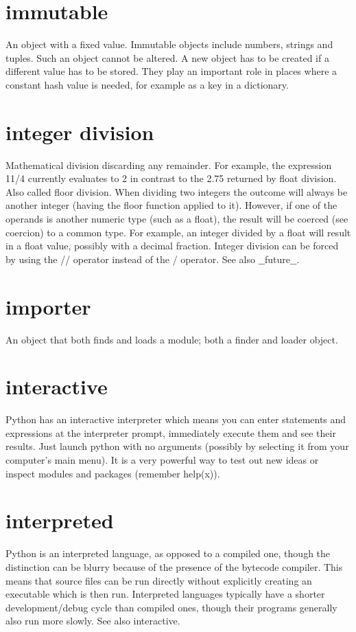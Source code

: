 \documentclass[12pt,a4paper,final,twoside,onecolumn,titlepage]{book}
\begin{document}
\section{immutable}
An object with a fixed value. Immutable objects include numbers, strings and tuples. Such an object cannot be altered. A new object has to be created if a different value has to be stored. They play an important role in places where a constant hash value is needed, for example as a key in a dictionary.

\section{integer division}
Mathematical division discarding any remainder. For example, the expression 11/4 currently evaluates to 2 in contrast to the 2.75 returned by float division. Also called floor division. When dividing two integers the outcome will always be another integer (having the floor function applied to it). However, if one of the operands is another numeric type (such as a float), the result will be coerced (see coercion) to a common type. For example, an integer divided by a float will result in a float value, possibly with a decimal fraction. Integer division can be forced by using the // operator instead of the / operator. See also $\_\_$future$\_\_$.
\section{importer}
An object that both finds and loads a module; both a finder and loader object.
\section{interactive}
Python has an interactive interpreter which means you can enter statements and expressions at the interpreter prompt, immediately execute them and see their results. Just launch python with no arguments (possibly by selecting it from your computer’s main menu). It is a very powerful way to test out new ideas or inspect modules and packages (remember help(x)).
\section{interpreted}
Python is an interpreted language, as opposed to a compiled one, though the distinction can be blurry because of the presence of the bytecode compiler. This means that source files can be run directly without explicitly creating an executable which is then run. Interpreted languages typically have a shorter development/debug cycle than compiled ones, though their programs generally also run more slowly. See also interactive.
\end{document}
